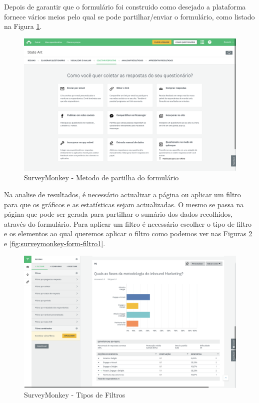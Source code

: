 Depois de garantir que o formulário foi construido como desejado a plataforma fornece vários meios pelo qual se pode partilhar/enviar o formulário, como listado na Figura \ref{fig:surveymonkey-form-share}.

\newpage

\begin{figure}[ht!]
	\begin{center}
		\includegraphics[width=1\textwidth]{img/sm/surveymonkey-form-share}
		\caption{SurveyMonkey - Metodo de partilha do formulário }
		\label{fig:surveymonkey-form-share}
	\end{center}
\end{figure}

Na analise de resultados, é necessário actualizar a página ou aplicar um filtro para que os gráficos e as estatísticas sejam actualizadas. 
O mesmo se passa na página que pode ser gerada para partilhar o sumário dos dados recolhidos, através do formulário. 
Para aplicar um filtro é necessário escolher o tipo de filtro e os elementos ao qual queremos aplicar o filtro como podemos ver nas Figuras \ref{fig:surveymonkey-form-filtro} e \ref{fig:surveymonkey-form-filtro1}. 


\begin{figure}[ht!]
	\begin{center}
		\includegraphics[width=1\textwidth]{img/sm/surveymonkey-form-filtro}
		\caption{SurveyMonkey - Tipos de Filtros }
		\label{fig:surveymonkey-form-filtro}
	\end{center}
\end{figure}



